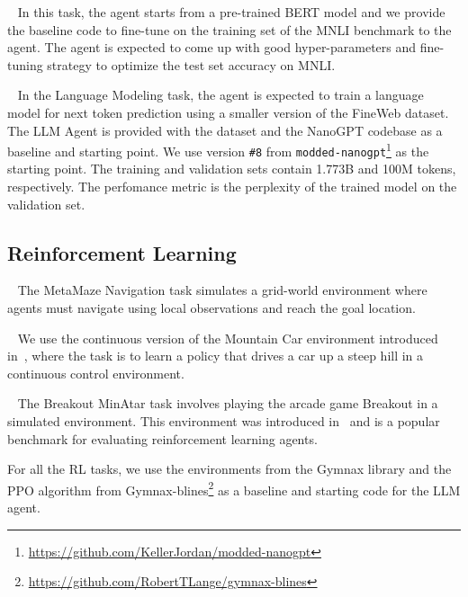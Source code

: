 ~\citep{williams2018multi} In this task, the agent starts from a pre-trained BERT model \citep{devlin2018bert} and we provide the baseline code to fine-tune on the training set of the MNLI benchmark to the agent. The agent is expected to come up with good hyper-parameters and fine-tuning strategy to optimize the test set accuracy on MNLI.

~\citep{modded_nanogpt_2024} In the Language Modeling task, the agent is expected to train a language model for next token prediction using a smaller version of the FineWeb \citep{penedo2024finewebdatasetsdecantingweb} dataset.
%
The LLM Agent is provided with the dataset and the NanoGPT \citep{modded_nanogpt_2024} codebase as a baseline and starting point. We use version \texttt{\#8} from \texttt{modded-nanogpt}\footnote{\url{https://github.com/KellerJordan/modded-nanogpt}} as the starting point. The training and validation sets contain 1.773B and 100M tokens, respectively.
%
The perfomance metric is the perplexity of the trained model on the validation set.


\subsection{Reinforcement Learning}


~\citep{miconi2020backpropaminetrainingselfmodifyingneural} The MetaMaze Navigation task simulates a grid-world environment where agents must navigate using local observations and reach the goal location.

~\citep{brockman2016openaigym} We use the continuous version of the Mountain Car environment introduced in~\citet{brockman2016openaigym}, where the task is to learn a policy that drives a car up a steep hill in a continuous control environment.

~\citep{young2019minataratariinspiredtestbedthorough} The Breakout MinAtar task involves playing the arcade game Breakout in a simulated environment.
This environment was introduced in~\citet{young2019minataratariinspiredtestbedthorough} and is a popular benchmark for evaluating reinforcement learning agents.

For all the RL tasks, we use the environments from the Gymnax library \citep{gymnax2022github} and the PPO algorithm from Gymnax-blines\footnote{\url{https://github.com/RobertTLange/gymnax-blines}} as a baseline and starting code for the LLM agent.


